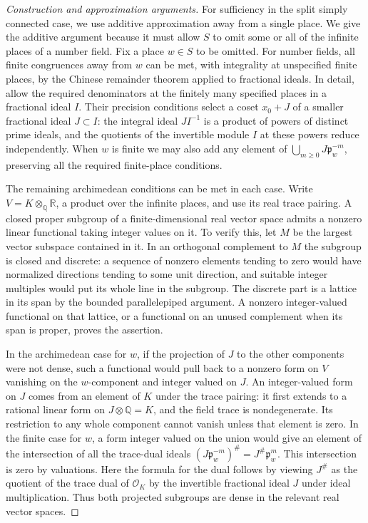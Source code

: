 \documentclass[11pt,a4paper,openany,oneside]{book}
\theoremstyle{resultstyle}
\theoremstyle{definition}
\numberwithin{equation}{chapter}
\newcommand{\OO}{\mathcal{O}}
\newcommand{\RR}{\mathbb{R}}
\newcommand{\QQ}{\mathbb{Q}}
\begin{document}
\begin{proof}[Construction and approximation arguments]
For sufficiency in the split simply connected case,
we use additive approximation away from a single place.
We give the additive argument because it must allow $S$
to omit some or all of the infinite places of a number
field. Fix a place $w\in S$ to be omitted. For number
fields, all finite congruences away from $w$ can be met,
with integrality at unspecified finite places, by the
Chinese remainder theorem applied to fractional ideals.
In detail, allow the required denominators at the finitely
many specified places in a fractional ideal $I$. Their
precision conditions select a coset $x_0+J$ of a smaller
fractional ideal $J\subset I$: the integral ideal
$J I^{-1}$ is a product of powers of distinct prime
ideals, and the quotients of the invertible module $I$
at these powers reduce independently. When $w$ is
finite we may also add any element of
$\bigcup_{m\geq0}J\mathfrak p_w^{-m}$, preserving
all the required finite-place conditions.

The remaining archimedean conditions can be met in each
case. Write $V=K\otimes_{\QQ}\RR$, a product over the
infinite places, and use its real trace pairing.
A closed proper subgroup of a finite-dimensional real
vector space admits a nonzero linear functional taking
integer values on it. To verify this, let $M$ be the
largest vector subspace contained in it. In an
orthogonal complement to $M$ the subgroup is closed
and discrete: a sequence of nonzero elements tending
to zero would have normalized directions tending to
some unit direction, and suitable integer multiples
would put its whole line in the subgroup. The discrete
part is a lattice in its span by the bounded
parallelepiped argument. A nonzero integer-valued
functional on that lattice, or a functional on an
unused complement when its span is proper, proves
the assertion.

In the archimedean case for $w$, if the projection of
$J$ to the other components were not dense, such a
functional would pull back to a nonzero form on $V$
vanishing on the $w$-component and integer valued on
$J$. An integer-valued form on $J$ comes from an
element of $K$ under the trace pairing: it first
extends to a rational linear form on $J\otimes\QQ=K$,
and the field trace is nondegenerate. Its restriction
to any whole component cannot vanish unless that
element is zero. In the finite case for $w$, a form
integer valued on the union would give an element
of the intersection of all the trace-dual ideals
$(J\mathfrak p_w^{-m})^\#=J^\#\mathfrak p_w^m$.
This intersection is zero by valuations. Here the
formula for the dual follows by viewing $J^\#$ as
the quotient of the trace dual of $\OO_K$ by the
invertible fractional ideal $J$ under ideal
multiplication. Thus both projected subgroups are
dense in the relevant real vector spaces.


\end{proof}
\end{document}
